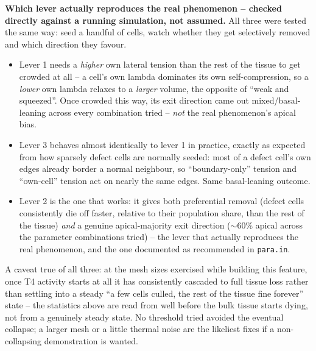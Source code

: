 \documentclass[11pt,a4paper]{report}
\begin{document}
\begin{physbox}
\textbf{Which lever actually reproduces the real phenomenon -- checked
directly against a running simulation, not assumed.} All three were
tested the same way: seed a handful of cells, watch whether they get
selectively removed and which direction they favour.
\begin{itemize}[leftmargin=1.4em]
  \item Lever 1 needs a \emph{higher} own lateral tension than the rest
  of the tissue to get crowded at all -- a cell's own lambda dominates
  its own self-compression, so a \emph{lower} own lambda relaxes to a
  \emph{larger} volume, the opposite of ``weak and squeezed''. Once
  crowded this way, its exit direction came out mixed/basal-leaning
  across every combination tried -- \emph{not} the real phenomenon's
  apical bias.
  \item Lever 3 behaves almost identically to lever 1 in practice,
  exactly as expected from how sparsely defect cells are normally
  seeded: most of a defect cell's own edges already border a normal
  neighbour, so ``boundary-only'' tension and ``own-cell'' tension act
  on nearly the same edges. Same basal-leaning outcome.
  \item Lever 2 is the one that works: it gives both preferential
  removal (defect cells consistently die off faster, relative to their
  population share, than the rest of the tissue) \emph{and} a genuine
  apical-majority exit direction ($\sim$60\% apical across the
  parameter combinations tried) -- the lever that actually reproduces
  the real phenomenon, and the one documented as recommended in
  \texttt{para.in}.
\end{itemize}
A caveat true of all three: at the mesh sizes exercised while building
this feature, once T4 activity starts at all it has consistently
cascaded to full tissue loss rather than settling into a steady ``a
few cells culled, the rest of the tissue fine forever'' state -- the
statistics above are read from well before the bulk tissue starts
dying, not from a genuinely steady state. No threshold tried avoided
the eventual collapse; a larger mesh or a little thermal noise are the
likeliest fixes if a non-collapsing demonstration is wanted.
\end{physbox}
\end{document}
